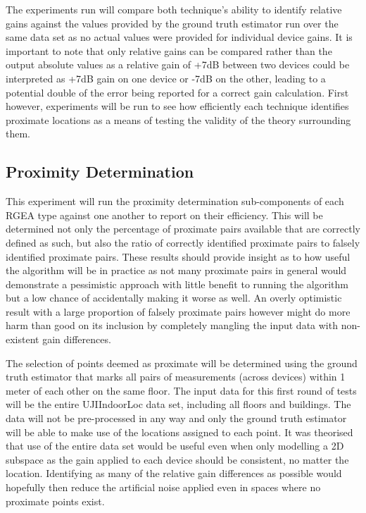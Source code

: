 \documentclass{UoYCSproject}
\begin{document}
            The experiments run will compare both technique's ability to identify relative gains against the values provided by the ground truth estimator run over the same data set as no actual values were provided for individual device gains. It is important to note that only relative gains can be compared rather than the output absolute values as a relative gain of +7dB between two devices could be interpreted as +7dB gain on one device or -7dB on the other, leading to a potential double of the error being reported for a correct gain calculation. First however, experiments will be run to see how efficiently each technique identifies proximate locations as a means of testing the validity of the theory surrounding them.

		    \subsection{Proximity Determination}
            \label{sec:prox_est}
            
                This experiment will run the proximity determination sub-components of each RGEA type against one another to report on their efficiency. This will be determined not only the percentage of proximate pairs available that are correctly defined as such, but also the ratio of correctly identified proximate pairs to falsely identified proximate pairs. These results should provide insight as to how useful the algorithm will be in practice as not many proximate pairs in general would demonstrate a pessimistic approach with little benefit to running the algorithm but a low chance of accidentally making it worse as well. An overly optimistic result with a large proportion of falsely proximate pairs however might do more harm than good on its inclusion by completely mangling the input data with non-existent gain differences.
                
                The selection of points deemed as proximate will be determined using the ground truth estimator that marks all pairs of measurements (across devices) within 1 meter of each other on the same floor. The input data for this first round of tests will be the entire UJIIndoorLoc data set, including all floors and buildings. The data will not be pre-processed in any way and only the ground truth estimator will be able to make use of the locations assigned to each point. It was theorised that use of the entire data set would be useful even when only modelling a 2D subspace as the gain applied to each device should be consistent, no matter the location. Identifying as many of the relative gain differences as possible would hopefully then reduce the artificial noise applied even in spaces where no proximate points exist. 
                
\end{document}
